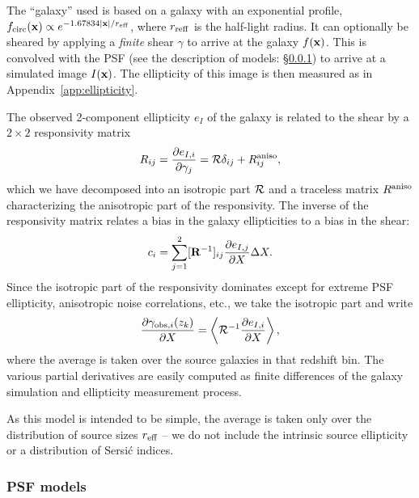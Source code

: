 \documentclass[aps,prd, amsmath,amssymb,superscriptaddress,showkeys,nofootinbib,reprint,preprintnumbers]{revtex4-1}
\begin{document}
\begin{widetext}
The ``galaxy'' used is based on a galaxy with an exponential profile,
$f_{\rm circ}({\bf x}) \propto e^{-1.67834|{\bf x}|/r_{\rm eff}}$,
where $r_{\rm reff}$ is the half-light radius. It can optionally be
sheared by applying a {\em finite} shear $\gamma$ to arrive at the
galaxy $f({\bf x})$. This is convolved with the PSF (see the
description of models: \S\ref{ss:PSF}) to arrive at a simulated image
$I({\bf x})$. The ellipticity of this image is then measured as in
Appendix~\ref{app:ellipticity}.

The observed 2-component ellipticity $e_I$ of the galaxy is related to
the shear by a $2\times 2$ responsivity matrix
\begin{equation}
R_{ij} = \frac{\partial e_{I,i}}{\partial\gamma_j} = {\cal R}\delta_{ij} + R^{\rm aniso}_{ij},
\end{equation}
which we have decomposed into an isotropic part ${\cal R}$ and a
traceless matrix $R^{\rm aniso}$ characterizing the anisotropic part
of the responsivity. The inverse of the responsivity matrix relates a
bias in the galaxy ellipticities to a bias in the shear:
\begin{equation}
c_i = \sum_{j=1}^2 [{\bf R}^{-1}]_{ij} \frac{\partial e_{I,j}}{\partial X} \Delta X.
\end{equation}
Since the isotropic part of the responsivity dominates except for
extreme PSF ellipticity, anisotropic noise correlations, etc., we take
the isotropic part and write
\begin{equation}
\frac{\partial\gamma_{{\rm obs},i}(z_k)}{\partial X} = \left\langle {\cal R}^{-1} \frac{\partial e_{I,i}}{\partial X} \right\rangle,
\end{equation}
where the average is taken over the source galaxies in that redshift
bin. The various partial derivatives are easily computed as finite
differences of the galaxy simulation and ellipticity measurement
process.

As this model is intended to be simple, the average is taken only over
the distribution of source sizes $r_{\rm eff}$ -- we do not include
the intrinsic source ellipticity or a distribution of Sersi\'c
indices.

\subsubsection{PSF models}
\label{ss:PSF}


\end{widetext}
\end{document}
